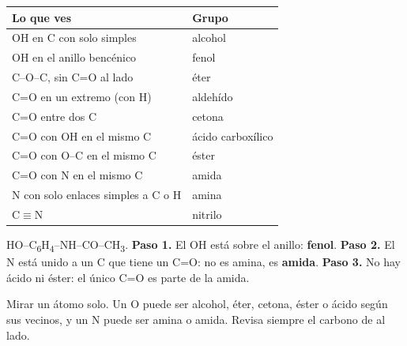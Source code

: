  
\begin{center}\small
\begin{tabular}{@{}ll@{}}
\toprule
\textbf{Lo que ves} & \textbf{Grupo} \\
\midrule
OH en C con solo simples & alcohol \\
OH en el anillo bencénico & fenol \\
C--O--C, sin C=O al lado & éter \\
C=O en un extremo (con H) & aldehído \\
C=O entre dos C & cetona \\
C=O con OH en el mismo C & ácido carboxílico \\
C=O con O--C en el mismo C & éster \\
C=O con N en el mismo C & amida \\
N con solo enlaces simples a C o H & amina \\
C\ensuremath{\equiv}N & nitrilo \\
\bottomrule
\end{tabular}
\end{center}
  
\begin{ejemplo} HO--C\textsubscript{6}H\textsubscript{4}--NH--CO--CH\textsubscript{3}. \textbf{Paso 1.} El OH está sobre el anillo: \textbf{fenol}. \textbf{Paso 2.} El N está unido a un C que tiene un C=O: no es amina, es \textbf{amida}. \textbf{Paso 3.} No hay ácido ni éster: el único C=O es parte de la amida.\end{ejemplo}
 
\begin{ojo} Mirar un átomo solo. Un O puede ser alcohol, éter, cetona, éster o ácido según sus vecinos, y un N puede ser amina o amida. Revisa siempre el carbono de al lado.\end{ojo}
